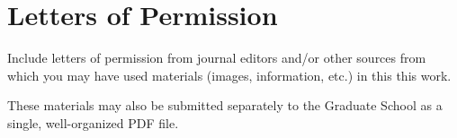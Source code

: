 \cleartooddpage[\thispagestyle{empty}]
\chapter{Letters of Permission}

Include letters of permission from journal editors and/or other
sources from which you may have used materials (images, information, etc.)
in this this work.

These materials may also be submitted separately to the Graduate
School as a single, well-organized PDF file.
